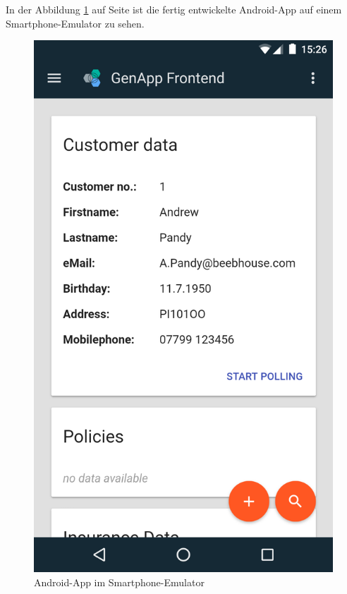 In der Abbildung \ref{fig:frontend_smartphone_android} auf Seite \pageref{fig:frontend_smartphone_android} ist die fertig
entwickelte Android-App auf einem Smartphone-Emulator zu sehen.

\begin{figure}[h]
 \centering
   \includegraphics[scale=0.19]{images/kapitel_4/frontend_smartphone_android.png}
 \caption{Android-App im Smartphone-Emulator}
 \label{fig:frontend_smartphone_android}
\end{figure}

